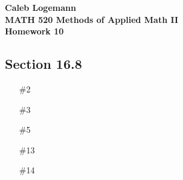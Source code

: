 \documentclass[11pt, oneside]{article}
\begin{document}
\noindent \textbf{\Large{Caleb Logemann \\
MATH 520 Methods of Applied Math II \\
Homework 10
}}

\subsection*{Section 16.8}
\begin{enumerate}
  \item[\#2]
  \item[\#3]
  \item[\#5]
  \item[\#13]
  \item[\#14]
\end{enumerate}
\end{document}
